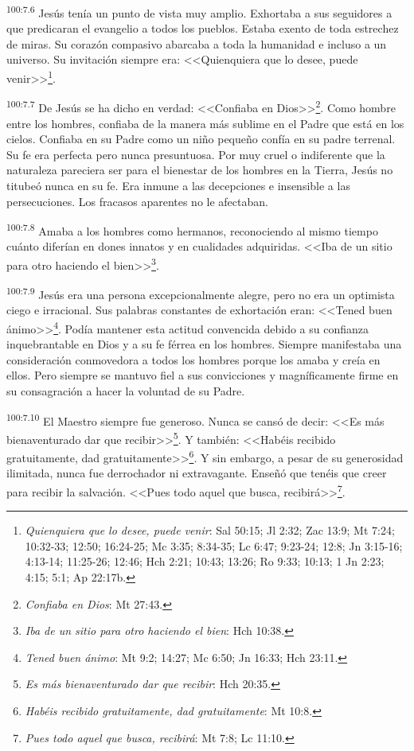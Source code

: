 \par
\textsuperscript{100:7.6} Jesús tenía un punto de vista muy amplio. Exhortaba a sus seguidores a que predicaran el evangelio a todos los pueblos. Estaba exento de toda estrechez de miras. Su corazón compasivo abarcaba a toda la humanidad e incluso a un universo. Su invitación siempre era: <<Quienquiera que lo desee, puede venir>>\footnote{\textit{Quienquiera que lo desee, puede venir}: Sal 50:15; Jl 2:32; Zac 13:9; Mt 7:24; 10:32-33; 12:50; 16:24-25; Mc 3:35; 8:34-35; Lc 6:47; 9:23-24; 12:8; Jn 3:15-16; 4:13-14; 11:25-26; 12:46; Hch 2:21; 10:43; 13:26; Ro 9:33; 10:13; 1 Jn 2:23; 4:15;  5:1; Ap 22:17b.}.

\par
\textsuperscript{100:7.7} De Jesús se ha dicho en verdad: <<Confiaba en Dios>>\footnote{\textit{Confiaba en Dios}: Mt 27:43.}. Como hombre entre los hombres, confiaba de la manera más sublime en el Padre que está en los cielos. Confiaba en su Padre como un niño pequeño confía en su padre terrenal. Su fe era perfecta pero nunca presuntuosa. Por muy cruel o indiferente que la naturaleza pareciera ser para el bienestar de los hombres en la Tierra, Jesús no titubeó nunca en su fe. Era inmune a las decepciones e insensible a las persecuciones. Los fracasos aparentes no le afectaban.

\par
\textsuperscript{100:7.8} Amaba a los hombres como hermanos, reconociendo al mismo tiempo cuánto diferían en dones innatos y en cualidades adquiridas. <<Iba de un sitio para otro haciendo el bien>>\footnote{\textit{Iba de un sitio para otro haciendo el bien}: Hch 10:38.}.

\par
\textsuperscript{100:7.9} Jesús era una persona excepcionalmente alegre, pero no era un optimista ciego e irracional. Sus palabras constantes de exhortación eran: <<Tened buen ánimo>>\footnote{\textit{Tened buen ánimo}: Mt 9:2; 14:27; Mc 6:50; Jn 16:33; Hch 23:11.}. Podía mantener esta actitud convencida debido a su confianza inquebrantable en Dios y a su fe férrea en los hombres. Siempre manifestaba una consideración conmovedora a todos los hombres porque los amaba y creía en ellos. Pero siempre se mantuvo fiel a sus convicciones y magníficamente firme en su consagración a hacer la voluntad de su Padre.

\par
\textsuperscript{100:7.10} El Maestro siempre fue generoso. Nunca se cansó de decir: <<Es más bienaventurado dar que recibir>>\footnote{\textit{Es más bienaventurado dar que recibir}: Hch 20:35.}. Y también: <<Habéis recibido gratuitamente, dad gratuitamente>>\footnote{\textit{Habéis recibido gratuitamente, dad gratuitamente}: Mt 10:8.}. Y sin embargo, a pesar de su generosidad ilimitada, nunca fue derrochador ni extravagante. Enseñó que tenéis que creer para recibir la salvación. <<Pues todo aquel que busca, recibirá>>\footnote{\textit{Pues todo aquel que busca, recibirá}: Mt 7:8; Lc 11:10.}.

